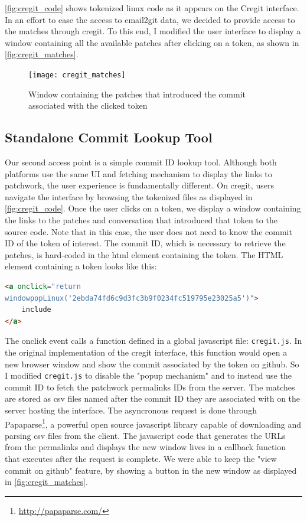 \autoref{fig:cregit_code} shows tokenized linux code as it appears on the Cregit interface. In an effort to ease the access to email2git data, we decided to provide access to the matches through cregit. To this end, I modified the user interface to display a window containing all the available patches after clicking on a token, as shown in \autoref{fig:cregit_matches}. 

\begin{figure}[htb]
\centering
\texttt{[image: cregit\_matches]}
\caption{Window containing the patches that introduced the commit associated with the clicked token}
\label{fig:cregit_matches}
\end{figure}




\subsection{Standalone Commit Lookup Tool}



Our second access point is a simple commit ID lookup tool. Although both platforms use the same UI and fetching mechanism to display the links to patchwork, the user experience is fundamentally different. On cregit, users navigate the interface by browsing the tokenized files as displayed in \autoref{fig:cregit_code}. Once the user clicks on a token, we display a window containing the links to the patches and conversation that introduced that token to the source code. Note that in this case, the user does not need to know the commit ID of the token of interest. The commit ID, which is necessary to retrieve the patches, is hard-coded in the html element containing the token. The HTML element containing a token looks like this:

\begin{lstlisting}[language=HTML]
<a onclick="return 
windowpopLinux('2ebda74fd6c9d3fc3b9f0234fc519795e23025a5')">
	include
</a>
\end{lstlisting}

The onclick event calls a function defined in a global javascript file: \texttt{cregit.js}. In the original implementation of the cregit interface, this function would open a new browser window and show the commit associated by the token on github. So I modified \texttt{cregit.js} to disable the "popup mechanism" and to instead use the commit ID to fetch the patchwork permalinks IDs from the server. The matches are stored as csv files named after the commit ID they are associated with on the server hosting the interface. The asyncronous request is done through Papaparse\footnote{\url{http://papaparse.com/}}, a powerful open source javascript library capable of downloading and parsing csv files from the client. The javascript code that generates the URLs from the permalinks and displays the new window lives in a callback function that executes after the request is complete. We were able to keep the "view commit on github" feature, by showing a button in the new window as displayed in \autoref{fig:cregit_matches}.  

